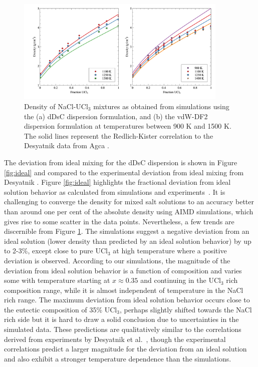 \documentclass[preprint,3p,10pt,onecolumn,number,sort&compress]{elsarticle}
\begin{document}
\begin{figure}[htb]
\centering
\includegraphics[width=0.9\textwidth]{fig7.jpg}
\caption{Density of NaCl-UCl$_3$ mixtures as obtained from simulations using the (a) dDsC dispersion formulation, and (b) the vdW-DF2 dispersion formulation at temperatures between 900 K and 1500 K. The solid lines represent the Redlich-Kister correlation to the Desyatnik \cite{Desyatnik} data from Agca \cite{agca2022}.%
} 
\label{fig:NaClUCl3}
\end{figure}

The deviation from ideal mixing for the dDsC dispersion is shown in Figure \ref{fig:ideal} and compared to the experimental deviation from ideal mixing from Desyatnik \cite{Desyatnik}. Figure \ref{fig:ideal} highlights the fractional deviation from ideal solution behavior as calculated from simulations and experiments~\cite{agca2022,Desyatnik}. It is challenging to converge the density for mixed salt solutions to an accuracy better than around one per cent of the absolute density using AIMD simulations, which gives rise to some scatter in the data points. Nevertheless, a few trends are discernible from Figure \ref{fig:NaClUCl3}. The simulations suggest a negative deviation from an ideal solution (lower density than predicted by an ideal solution behavior) by up to 2-3\%, except close to pure UCl$_3$ at high temperature where a positive deviation is observed. According to our simulations, the magnitude of the deviation from ideal solution behavior is a function of composition and varies some with temperature starting at $x\approx0.35$ and continuing in the UCl$_3$ rich composition range, while it is almost independent of temperature in the NaCl rich range. 
The maximum deviation from ideal solution behavior occurs close to the eutectic composition of 35\% UCl$_3$, perhaps slightly shifted towards the NaCl rich side but it is hard to draw a solid conclusion due to uncertainties in the simulated data. These predictions are qualitatively similar to the correlations derived from experiments by Desyatnik et al.~\cite{Desyatnik}, though the experimental correlations predict a larger magnitude for the deviation from an ideal solution and also exhibit a stronger temperature dependence than the simulations. 
\end{document}
